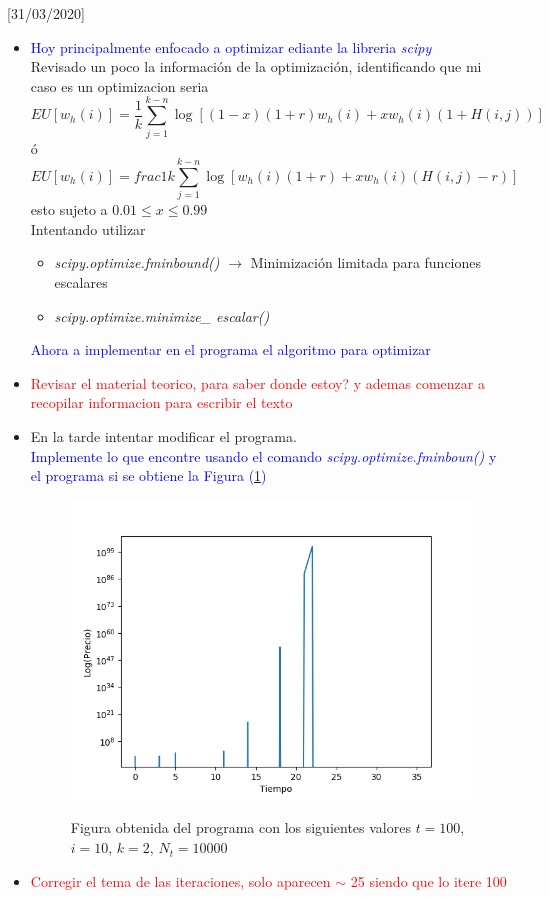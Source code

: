 \documentclass[a4paper,14pt]{article}
\begin{document}
[31/03/2020]
\begin{itemize}
\item \textcolor{blue}{Hoy principalmente enfocado a optimizar ediante la libreria \textit{scipy}}\\
\quad Revisado un poco la información de la optimización, identificando que mi caso es un optimizacion seria
\begin{equation}
EU[w_h(i)] = \frac{1}{k}\sum^{k-n}_{j=1}\log{[(1-x)(1+r)w_h(i)+xw_{h}(i)(1+H(i,j))]}
\end{equation}
ó
\begin{equation}
EU[w_h(i)] = frac{1}{k}\sum^{k-n}_{j=1}\log{[w_h(i)(1+r)+xw_{h}(i)(H(i,j)-r)]}
\end{equation}
esto sujeto a $0.01\leq x \leq 0.99$\\
 Intentando utilizar 
\begin{itemize}
\item \textit{scipy.optimize.fminbound()} $\rightarrow$ Minimización limitada para funciones escalares
\item \textit{scipy.optimize.minimize\_ escalar()}
\end{itemize}
\textcolor{blue}{Ahora a implementar en el programa el algoritmo para optimizar}
\item \textcolor{red}{Revisar el material teorico, para saber donde estoy? y ademas comenzar a recopilar informacion para escribir el texto}
\item En la tarde intentar modificar el programa.\\ 
\textcolor{blue}{Implemente lo que encontre usando el comando \textit{scipy.optimize.fminboun()} y el programa si se obtiene la Figura (\ref{F1[30/03/2020]})}
\begin{figure}[h]
\centering
\includegraphics[scale=0.5]{Figure_1.png}
\label{F1[30/03/2020]}
\caption{Figura obtenida del programa con los siguientes valores $t=100$, $i=10$, $k=2$, $N_t=10000$}
\end{figure}

\item \textcolor{red}{Corregir el tema de las iteraciones, solo aparecen $\sim$ 25 siendo que lo itere 100}
\end{itemize}
\end{document}
